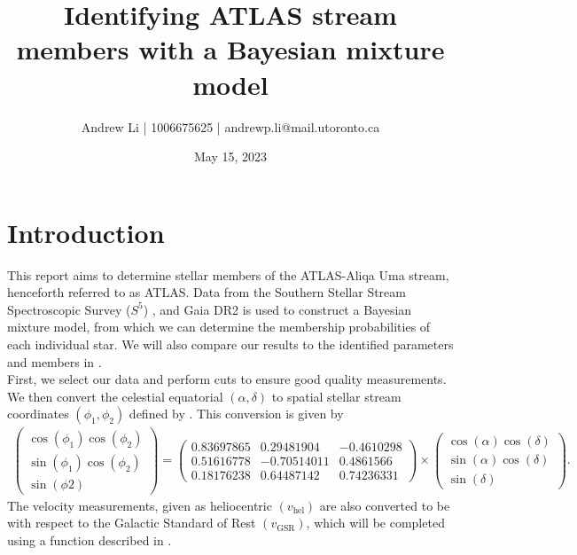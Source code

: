 \documentclass{article}
\title{Identifying ATLAS stream members with a Bayesian mixture model}
\author{Andrew Li | 1006675625 | andrewp.li@mail.utoronto.ca}
\date{May 15, 2023}
\begin{document}
\maketitle

\vspace{-2em}

\section{Introduction}

This report aims to determine stellar members of the ATLAS-Aliqa Uma stream, henceforth referred to as ATLAS. Data from the Southern Stellar Stream Spectroscopic Survey ($S^5$) \citep{10.1093/mnras/stz2731}, and Gaia DR2 \citep{refId0} is used to construct a Bayesian mixture model, from which we can determine the membership probabilities of each individual star. We will also compare our results to the identified parameters and members in \citep{2021ApJ...911..149L}.\\

First, we select our data and perform cuts to ensure good quality measurements. We then convert the celestial equatorial $(\alpha, \delta)$ to spatial stellar stream coordinates $(\phi_1,\phi_2)$ defined by \citep{Shipp_2019}. This conversion is given by
\begin{align}
    \begin{pmatrix}
        \cos(\phi_1)\cos(\phi_2)\\\sin(\phi_1)\cos(\phi_2)\\\sin(\phi2)
    \end{pmatrix}=
    \begin{pmatrix}
        0.83697865& 0.29481904& -0.4610298\\
        0.51616778& -0.70514011& 0.4861566\\
        0.18176238& 0.64487142& 0.74236331
    \end{pmatrix}\times
    \begin{pmatrix}
        \cos(\alpha)\cos(\delta)\\\sin(\alpha)\cos(\delta)\\\sin(\delta)
    \end{pmatrix}.\label{eq:1}
\end{align}
The velocity measurements, given as heliocentric $(v_\text{hel})$ are also converted to be with respect to the Galactic Standard of Rest $(v_\text{GSR})$, which will be completed using a function described in \citet{Price-Whelan_2023}.\\
\end{document}
